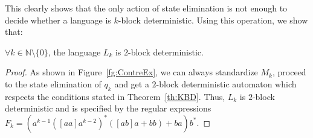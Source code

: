 \documentclass{llncs}
\begin{document}
This clearly shows that the only action of state elimination is not enough to decide whether a language is $k$-block deterministic.
Using this operation, we show that:

\begin{proposition}
	$\forall k \in \mathbb{N} \setminus \{0\}$, the language $L_k$ is $2$-block deterministic.
\end{proposition}
\begin{proof}
	As shown in Figure~\ref{fg:ContreEx}, we can always standardize $M_k$, proceed to the state elimination of $q_k$ and get a $2$-block deterministic automaton which respects the conditions stated in Theorem~\ref{th:KBD}.
Thus, $L_k$ is $2$-block deterministic and is specified by the regular expressions $F_k = (a^{k-1}([aa]a^{k-2})^*([ab]a + bb) + ba)b^*$.
\end{proof}
\end{document}
